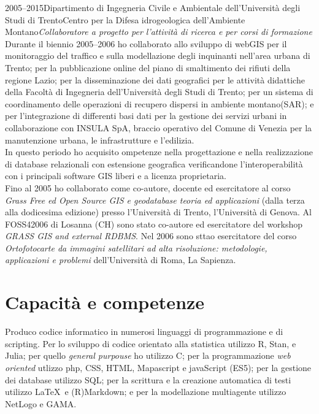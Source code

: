 \documentclass{curriculum}
\begin{document}
    \begin{entrylist}
    \entry
        {2005--2015}{Dipartimento di Ingegneria Civile e Ambientale dell'Università degli Studi di Trento}{Centro per la Difesa idrogeologica dell'Ambiente Montano}{\emph{Collaboratore a progetto per l'attività di ricerca e per corsi di formazione}\hfill\vspace{3pt}\\
        Durante il biennio 2005--2006 ho collaborato allo sviluppo di webGIS per il monitoraggio del traffico e sulla modellazione degli inquinanti nell'area urbana di Trento; per la pubblicazione online del piano di smaltimento dei rifiuti della regione Lazio; per la disseminazione dei dati geografici per le attività didattiche della Facoltà di Ingegneria dell'Università degli Studi di Trento; per un sistema di coordinamento delle operazioni di recupero dispersi in ambiente montano(SAR); e per l'integrazione di differenti basi dati per la gestione dei servizi urbani in collaborazione con INSULA SpA, braccio operativo del Comune di Venezia per la manutenzione urbana, le infrastrutture e l'edilizia.
        \\In questo periodo ho acquisito ompetenze nella progettazione e nella realizzazione di database relazionali con estensione geografica verificandone l'interoperabilità con i principali software GIS liberi e a licenza proprietaria.
        \\Fino al 2005 ho collaborato come co-autore, docente ed esercitatore al corso \textit{Grass Free ed Open Source GIS e geodatabase teoria ed applicazioni} (dalla terza alla dodicesima edizione) presso l'Università di Trento, l'Università di Genova. Al FOSS42006 di Losanna (CH) sono stato co-autore ed esercitatore del workshop \textit{GRASS GIS and external RDBMS}. Nel 2006 sono sttao esercitatore del corso \textit{Ortofotocarte da immagini satellitari ad alta risoluzione: metodologie, applicazioni e problemi} dell'Università di Roma, La Sapienza.}
    \end{entrylist}
    
    \section{Capacità e competenze}
        Produco codice informatico in numerosi linguaggi di programmazione e di scripting. Per lo sviluppo di codice orientato alla statistica utilizzo R, Stan, e Julia; per quello \textit{general purpouse} ho utilizzo C; per la programmazione  \textit{web oriented} utlizzo php, CSS, HTML, Mapascript e javaScript (ES5); per la gestione dei database utilizzo SQL; per la scrittura e la creazione automatica di testi utilizzo \LaTeX~e (R)Markdown; e per la modellazione multiagente utilizzo NetLogo e GAMA.
        
\end{document}
